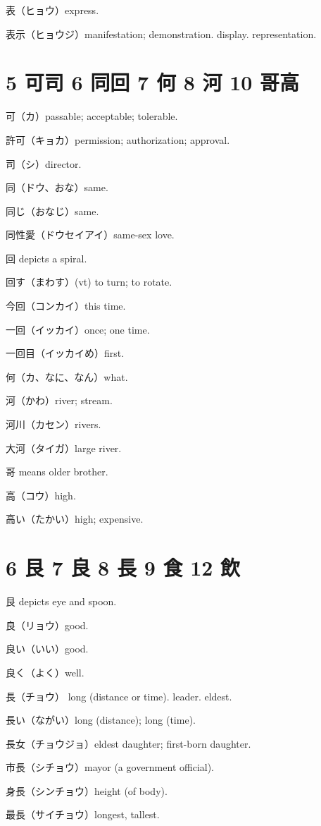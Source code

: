 表（ヒョウ）express.

表示（ヒョウジ）manifestation; demonstration. display. representation.

\section{5 可司 6 同回 7 何 8 河 10 哥高}

可（カ）passable; acceptable; tolerable.

許可（キョカ）permission; authorization; approval.

司（シ）director.

同（ドウ、おな）same.

同じ（おなじ）same.

同性愛（ドウセイアイ）same-sex love.

回 depicts a spiral.

回す（まわす）(vt) to turn; to rotate.

今回（コンカイ）this time.

一回（イッカイ）once; one time.

一回目（イッカイめ）first.

何（カ、なに、なん）what.

河（かわ）river; stream.

河川（カセン）rivers.

大河（タイガ）large river.

哥 means older brother.

高（コウ）high.

高い（たかい）high; expensive.

\section{6 艮 7 良 8 長 9 食 12 飲}

艮 depicts eye and spoon.

良（リョウ）good.

良い（いい）good.

良く（よく）well.

長（チョウ）
long (distance or time).
leader.
eldest.

長い（ながい）long (distance); long (time).

長女（チョウジョ）eldest daughter; first-born daughter.

市長（シチョウ）mayor (a government official).

身長（シンチョウ）height (of body).

最長（サイチョウ）longest, tallest.

